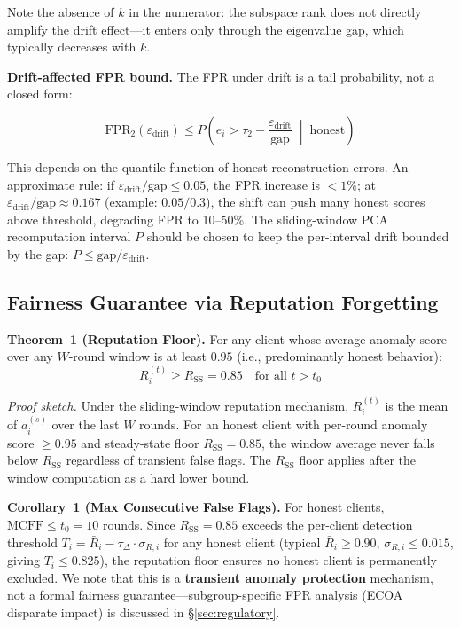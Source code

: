 \documentclass[10pt,journal]{IEEEtran}
\begin{document}
Note the absence of $k$ in the numerator: the subspace rank does not directly amplify the drift effect---it enters only through the eigenvalue gap, which typically decreases with $k$.

\textbf{Drift-affected FPR bound.} The FPR under drift is a tail probability, not a closed form:

\begin{equation}
\text{FPR}_2(\varepsilon_{\text{drift}}) \le P\!\left(e_i > \tau_2 - \frac{\varepsilon_{\text{drift}}}{\text{gap}} \;\middle|\; \text{honest}\right)
\label{eq:fpr-drift-concept}
\end{equation}

This depends on the quantile function of honest reconstruction errors. An approximate rule: if $\varepsilon_{\text{drift}} / \text{gap} \le 0.05$, the FPR increase is $< 1\%$; at $\varepsilon_{\text{drift}} / \text{gap} \approx 0.167$ (example: $0.05/0.3$), the shift can push many honest scores above threshold, degrading FPR to 10--50\%. The sliding-window PCA recomputation interval $P$ should be chosen to keep the per-interval drift bounded by the gap: $P \le \text{gap} / \varepsilon_{\text{drift}}$.

\subsection{Fairness Guarantee via Reputation Forgetting}

\textbf{Theorem~1 (Reputation Floor).} For any client whose average anomaly score over any $W$-round window is at least $0.95$ (i.e., predominantly honest behavior):
\begin{equation}
R_i^{(t)} \ge R_{\text{SS}} = 0.85 \quad \text{for all } t > t_0
\end{equation}

\textit{Proof sketch.} Under the sliding-window reputation mechanism, $R_i^{(t)}$ is the mean of $a_i^{(s)}$ over the last $W$ rounds. For an honest client with per-round anomaly score $\ge 0.95$ and steady-state floor $R_{\text{SS}} = 0.85$, the window average never falls below $R_{\text{SS}}$ regardless of transient false flags. The $R_{\text{SS}}$ floor applies after the window computation as a hard lower bound.

\textbf{Corollary~1 (Max Consecutive False Flags).} For honest clients, $\text{MCFF} \le t_0 = 10$ rounds. Since $R_{\text{SS}} = 0.85$ exceeds the per-client detection threshold $T_i = \bar{R}_i - \tau_\Delta \cdot \sigma_{R,i}$ for any honest client (typical $\bar{R}_i \ge 0.90$, $\sigma_{R,i} \le 0.015$, giving $T_i \le 0.825$), the reputation floor ensures no honest client is permanently excluded. We note that this is a \textbf{transient anomaly protection} mechanism, not a formal fairness guarantee---subgroup-specific FPR analysis (ECOA disparate impact) is discussed in \S\ref{sec:regulatory}.
\end{document}
